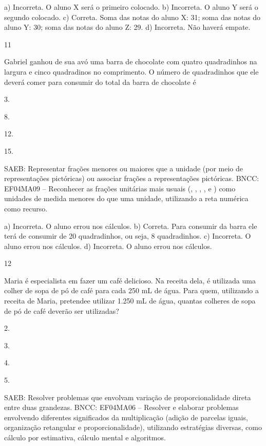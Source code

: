 \begin{mdframed}[linewidth=2pt,linecolor=salmao,roundcorner=2pt]
\begin{escolha}
{\begin{escolha}
a) Incorreta. O aluno X será o primeiro colocado.
b) Incorreta. O aluno Y será o segundo colocado.
c) Correta. Soma das notas do aluno X: 31; soma das notas do aluno Y: 30; soma das notas do aluno Z: 29.
d) Incorreta. Não haverá empate.

\num{11}

Gabriel ganhou de sua avó uma barra de chocolate com quatro quadradinhos na largura e cinco quadradinos no comprimento.
O número de quadradinhos que ele deverá comer para consumir  do total
da barra de chocolate é

\begin{escolha}
\item
  3.
\item
  8.
\item
  12.
\item
  15.
\end{escolha}

SAEB: Representar frações menores ou maiores que a unidade
(por meio de representações pictóricas) ou associar frações a
representações pictóricas.
BNCC: EF04MA09 -- Reconhecer as frações unitárias mais usuais (, , , ,  e ) como
unidades de medida menores do que uma unidade, utilizando a reta numérica como recurso.

a) Incorreta. O aluno errou nos cálculos.
b) Correta. Para consumir  da barra ele terá de consumir  de 20 quadradinhos, ou seja, 8 quadradinhos.
c) Incorreta. O aluno errou nos cálculos.
d) Incorreta. O aluno errou nos cálculos.

\num{12}

Maria é especialista em fazer um café delicioso. Na receita dela, é utilizada uma colher de sopa de pó de café para cada 250 mL
de água. Para quem, utilizando a receita de Maria, pretendee utilizar 1.250
mL de água, quantas colheres de sopa de pó de café deverão ser utilizadas?

\begin{escolha}
\item
  2.
\item
  3.
\item
  4.
\item
  5.
\end{escolha}

SAEB: Resolver problemas que envolvam variação de
proporcionalidade direta entre duas grandezas.
BNCC: EF04MA06 -- Resolver e elaborar problemas envolvendo diferentes significados da multiplicação
(adição de parcelas iguais, organização retangular e proporcionalidade), utilizando estratégias
diversas, como cálculo por estimativa, cálculo mental e algoritmos.


\end{escolha}}
\end{escolha}
\end{mdframed}
